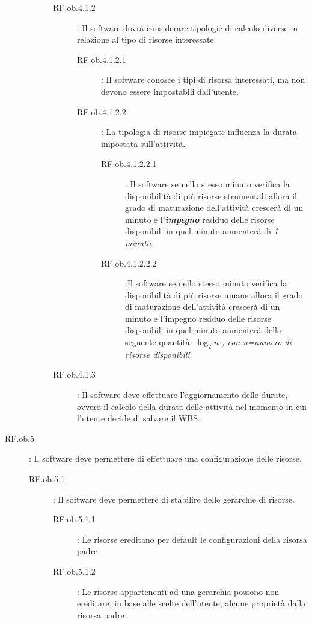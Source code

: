 \begin{description}
\begin{description}
\begin{description}
		\item[RF.ob.4.1.2]: Il software dovr\`{a} considerare tipologie di calcolo diverse in relazione al tipo di risorse interessate.
			\begin{description}
			\item[RF.ob.4.1.2.1]: Il software conosce i tipi di risorsa interessati, ma non devono essere impostabili dall\textquoteright{}utente.
			\item[RF.ob.4.1.2.2]: La tipologia di risorse impiegate influenza la durata impostata sull\textquoteright{}attivit\`{a}.
				\begin{description}
				\item[RF.ob.4.1.2.2.1]: Il software se nello stesso minuto verifica la disponibilit\`{a} di pi\`{u} risorse strumentali allora il grado di maturazione dell\textquoteright{}attivit\`{a} crescer\`{a} di un minuto e l\textquoteright{}\textit{\textbf{impegno}} residuo delle risorse disponibili in quel minuto aumenter\`{a} di \textit{1 minuto}.
				\item[RF.ob.4.1.2.2.2]:Il software se nello stesso minuto verifica la disponibilit\`{a} di pi\`{u} risorse umane allora il grado di maturazione dell\textquoteright{}attivit\`{a} crescer\`{a} di un minuto e l\textquoteright{}impegno residuo delle risorse disponibili in quel minuto aumenter\`{a} della seguente quantit\`{a}: \textit{$ \log_2 n $ , con n=numero di risorse disponibili}.
				\end{description}
			\end{description}
		\item[RF.ob.4.1.3]: Il software deve effettuare l\textquoteright{}aggiornamento delle durate, ovvero il calcolo della durata delle attivit\`{a} nel momento in cui l\textquoteright{}utente decide di salvare il WBS.
		\end{description}
	\end{description}
\item[RF.ob.5]: Il software deve permettere di effettuare una configurazione delle risorse.
	\begin{description}
	\item[RF.ob.5.1]: Il software deve permettere di stabilire delle gerarchie di risorse.
		\begin{description}
		\item[RF.ob.5.1.1]: Le risorse ereditano per default le configurazioni della risorsa padre.
		\item[RF.ob.5.1.2]: Le risorse appartenenti ad una gerarchia possono non ereditare, in base alle scelte dell\textquoteright{}utente, alcune propriet\`{a} dalla risorsa padre.

\end{description}
\end{description}
\end{description}

